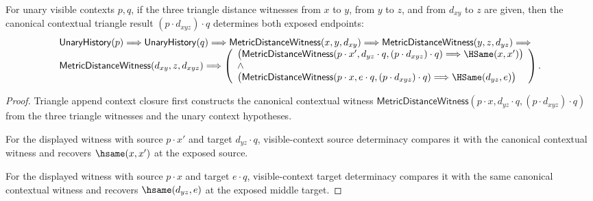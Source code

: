\begin{theorem}
\label{thm:metric-distance-witness-triangle-append-context-endpoint-determinacy}
For unary visible contexts $p,q$, if the three triangle distance witnesses
from $x$ to $y$, from $y$ to $z$, and from $d_{xy}$ to $z$ are given, then the
canonical contextual triangle result $(p\cdot d_{xyz})\cdot q$ determines both
exposed endpoints:
$$
\begin{array}{l}
\mathsf{UnaryHistory}(p)\Longrightarrow
\mathsf{UnaryHistory}(q)\Longrightarrow
\mathsf{MetricDistanceWitness}(x,y,d_{xy})\Longrightarrow
\mathsf{MetricDistanceWitness}(y,z,d_{yz})\Longrightarrow
\\
\mathsf{MetricDistanceWitness}(d_{xy},z,d_{xyz})\Longrightarrow
\left(
\begin{array}{l}
\bigl(\mathsf{MetricDistanceWitness}(p\cdot x',d_{yz}\cdot q,
(p\cdot d_{xyz})\cdot q)\Longrightarrow \HSame(x,x')\bigr)
\\
{}\wedge
\\
\bigl(\mathsf{MetricDistanceWitness}(p\cdot x,e\cdot q,
(p\cdot d_{xyz})\cdot q)\Longrightarrow \HSame(d_{yz},e)\bigr)
\end{array}
\right).
\end{array}
$$
\end{theorem}
\begin{proof}
Triangle append context closure first constructs the canonical contextual
witness
$\mathsf{MetricDistanceWitness}(p\cdot x,d_{yz}\cdot q,(p\cdot d_{xyz})\cdot q)$
from the three triangle witnesses and the unary context hypotheses.

For the displayed witness with source $p\cdot x'$ and target $d_{yz}\cdot q$,
visible-context source determinacy compares it with the canonical contextual
witness and recovers $\hsame(x,x')$ at the exposed source.

For the displayed witness with source $p\cdot x$ and target $e\cdot q$,
visible-context target determinacy compares it with the same canonical
contextual witness and recovers $\hsame(d_{yz},e)$ at the exposed middle target.
\end{proof}

